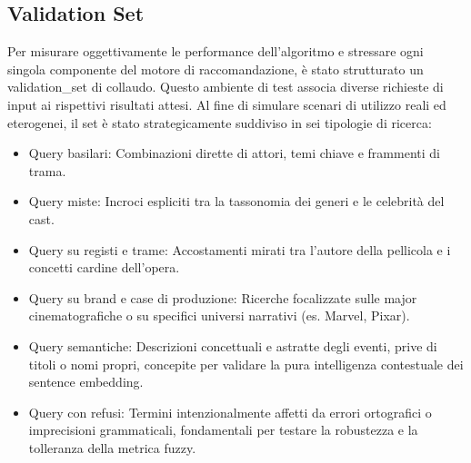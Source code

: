 \documentclass{article}
\begin{document}
\subsection{Validation Set}
Per misurare oggettivamente le performance dell'algoritmo e stressare ogni singola componente del motore di raccomandazione, \`e stato strutturato un validation\_set di collaudo. Questo ambiente di test associa diverse richieste di input ai rispettivi risultati attesi. Al fine di simulare scenari di utilizzo reali ed eterogenei, il set \`e stato strategicamente suddiviso in sei tipologie di ricerca:
\begin{itemize}
	\item Query basilari: Combinazioni dirette di attori, temi chiave e frammenti di trama.
	
	\item Query miste: Incroci espliciti tra la tassonomia dei generi e le celebrità del cast.
	
	\item Query su registi e trame: Accostamenti mirati tra l'autore della pellicola e i concetti cardine dell'opera.
	
	\item Query su brand e case di produzione: Ricerche focalizzate sulle major cinematografiche o su specifici universi narrativi (es. Marvel, Pixar).
	
	\item Query semantiche: Descrizioni concettuali e astratte degli eventi, prive di titoli o nomi propri, concepite per validare la pura intelligenza contestuale dei sentence embedding.
	
	\item Query con refusi: Termini intenzionalmente affetti da errori ortografici o imprecisioni grammaticali, fondamentali per testare la robustezza e la tolleranza della metrica fuzzy.
\end{itemize}
\end{document}
